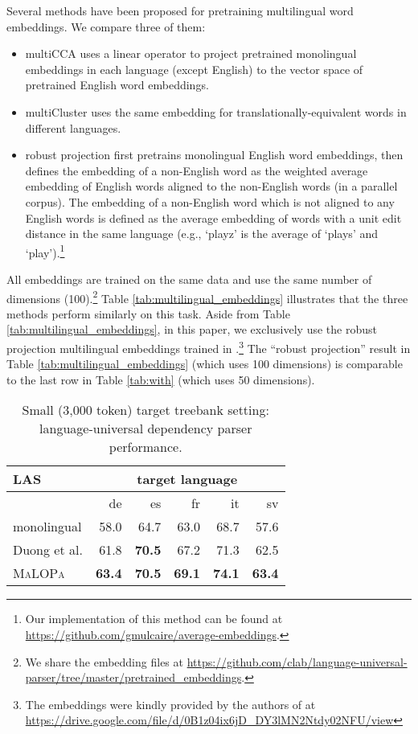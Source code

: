 \documentclass[11pt]{article}
\newcommand{\malopa}{\textsc{MaLOPa}}
\begin{document}
Several methods have been proposed for pretraining multilingual word embeddings.
We compare three of them:
\begin{itemize}
\item multiCCA \cite{ammar:16} uses a linear operator to project pretrained monolingual embeddings in each language (except English) to the vector space of pretrained English word embeddings.
\item multiCluster \cite{ammar:16} uses the same embedding for translationally-equivalent words in different languages.
\item robust projection \cite{guo:15} first pretrains monolingual English word embeddings, then defines the embedding of a non-English word as the weighted average embedding of English words aligned to the non-English words (in a parallel corpus). The embedding of a non-English word which is not aligned to any English words is defined as the average embedding of words with a unit edit distance in the same language (e.g., `playz' is the average of `plays' and `play').\footnote{Our implementation of this method can be found at \url{https://github.com/gmulcaire/average-embeddings}.}
\end{itemize}
All embeddings are trained on the same data and use the same number of dimensions (100).\footnote{We share the embedding files at \url{https://github.com/clab/language-universal-parser/tree/master/pretrained_embeddings}.}
Table \ref{tab:multilingual_embeddings} illustrates that the three methods perform similarly on this task.
Aside from Table \ref{tab:multilingual_embeddings}, in this paper, we exclusively use the robust projection multilingual embeddings trained in .\footnote{The embeddings were kindly provided by the authors of  at \url{https://drive.google.com/file/d/0B1z04ix6jD_DY3lMN2Ntdy02NFU/view}}
The ``robust projection'' result in Table \ref{tab:multilingual_embeddings} (which uses 100 dimensions) is comparable to the last row in Table \ref{tab:with} (which uses 50 dimensions).

\begin{table}[!]
\centering
\begin{tabular}{l|r|r|r|r|r}
LAS & \multicolumn{5}{c}{target language} \\ \hline
                   & {de} & {es} & {fr} & {it} & {sv}   \\ \hline
monolingual        & 58.0 & 64.7 & 63.0 & 68.7 & 57.6 \\ \hline
Duong et al.       & 61.8 & \textbf{70.5} & 67.2 & 71.3 & 62.5  \\
\malopa          & \textbf{63.4} & \textbf{70.5} & \textbf{69.1} & \textbf{74.1} & \textbf{63.4} 
\end{tabular}

\caption{Small (3,000 token) target treebank setting:  language-universal dependency parser performance.
\label{tab:small_treebank}}
\end{table}
\end{document}
